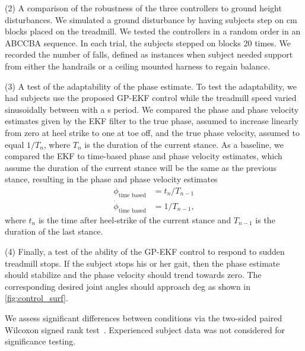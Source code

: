 (2) A comparison of the robustness of the three controllers to ground height
disturbances. We simulated a ground disturbance by having subjects step on
\unit[3]{cm} blocks placed on the treadmill. We tested the controllers in a
random order in an ABCCBA sequence.  In each trial, the subjects stepped on
blocks 20 times. We recorded the number of falls, defined as instances when
subject needed support from either the handrails or a ceiling mounted harness to
regain balance.

\begin{comment}
Additionally, subjects frequently experienced a problem where the prosthesis
knee collapsed towards the end of stance when the blocks were near the heel.
Therefore, we also looked at the number of times the knee flexion angle at toe
off was abnormally large when stepping on a block. Here we defined an abnormal
flexion angle as being greater than three median absolute deviations away from
the median toe off knee angle during undisturbed walking.
\end{comment}

(3) A test of the adaptability of the phase estimate.  To test the adaptability,
we had subjects use the proposed GP-EKF control while the treadmill speed varied
sinusoidally between  with a \unit[20]{s} period. We
compared the phase and phase velocity estimates given by the EKF filter to the
true phase, assumed to increase linearly from zero at heel strike to one at toe
off, and the true phase velocity, assumed to equal $1/T_n$, where $T_n$ is the
duration of the current stance. As a baseline, we compared the EKF to time-based
phase and phase velocity estimates, which assume the duration of the current
stance will be the same as the previous stance, resulting in the phase and phase
velocity estimates
\begin{align}
    \phi_\textrm{time based} &= t_n/T_{n-1} \\
    \dot{\phi}_\textrm{time based} &= 1/T_{n-1}, \label{eq:init_cond_time}
\end{align}
where $t_n$ is the time after heel-strike of the current stance and $T_{n-1}$ is
the duration of the last stance. 

(4) Finally, a test of the ability of the GP-EKF control to respond to sudden
treadmill stops. If the subject stops his or her gait, then the phase estimate
should stabilize and the phase velocity should trend towards zero. The
corresponding desired joint angles should approach \unit[5]{deg} as shown in
\cref{fig:control_surf}. 

We assess significant differences between conditions via the two-sided paired
Wilcoxon signed rank test~\citep{gibbons2011nonparametric}. Experienced subject
data was not considered for significance testing.
